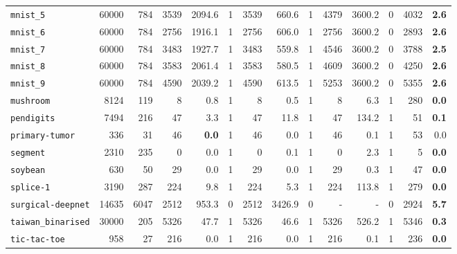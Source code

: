 \begin{tabular}{lccrrrrrrrrrrr}
\texttt{mnist\_5} & \multicolumn{1}{r}{60000} & \multicolumn{1}{r}{784}  & 3539 & 2094.6 & 1 & 3539 & 660.6 & 1 & 4379 & 3600.2 & 0 & 4032 & \textbf{2.6}\\
\texttt{mnist\_6} & \multicolumn{1}{r}{60000} & \multicolumn{1}{r}{784}  & 2756 & 1916.1 & 1 & 2756 & 606.0 & 1 & 2756 & 3600.2 & 0 & 2893 & \textbf{2.6}\\
\texttt{mnist\_7} & \multicolumn{1}{r}{60000} & \multicolumn{1}{r}{784}  & 3483 & 1927.7 & 1 & 3483 & 559.8 & 1 & 4546 & 3600.2 & 0 & 3788 & \textbf{2.5}\\
\texttt{mnist\_8} & \multicolumn{1}{r}{60000} & \multicolumn{1}{r}{784}  & 3583 & 2061.4 & 1 & 3583 & 580.5 & 1 & 4609 & 3600.2 & 0 & 4250 & \textbf{2.6}\\
\texttt{mnist\_9} & \multicolumn{1}{r}{60000} & \multicolumn{1}{r}{784}  & 4590 & 2039.2 & 1 & 4590 & 613.5 & 1 & 5253 & 3600.2 & 0 & 5355 & \textbf{2.6}\\
\texttt{mushroom} & \multicolumn{1}{r}{8124} & \multicolumn{1}{r}{119}  & 8 & 0.8 & 1 & 8 & 0.5 & 1 & 8 & 6.3 & 1 & 280 & \textbf{0.0}\\
\texttt{pendigits} & \multicolumn{1}{r}{7494} & \multicolumn{1}{r}{216}  & 47 & 3.3 & 1 & 47 & 11.8 & 1 & 47 & 134.2 & 1 & 51 & \textbf{0.1}\\
\texttt{primary-tumor} & \multicolumn{1}{r}{336} & \multicolumn{1}{r}{31}  & 46 & \textbf{0.0} & 1 & 46 & 0.0 & 1 & 46 & 0.1 & 1 & 53 & 0.0\\
\texttt{segment} & \multicolumn{1}{r}{2310} & \multicolumn{1}{r}{235}  & 0 & 0.0 & 1 & 0 & 0.1 & 1 & 0 & 2.3 & 1 & 5 & \textbf{0.0}\\
\texttt{soybean} & \multicolumn{1}{r}{630} & \multicolumn{1}{r}{50}  & 29 & 0.0 & 1 & 29 & 0.0 & 1 & 29 & 0.3 & 1 & 47 & \textbf{0.0}\\
\texttt{splice-1} & \multicolumn{1}{r}{3190} & \multicolumn{1}{r}{287}  & 224 & 9.8 & 1 & 224 & 5.3 & 1 & 224 & 113.8 & 1 & 279 & \textbf{0.0}\\
\texttt{surgical-deepnet} & \multicolumn{1}{r}{14635} & \multicolumn{1}{r}{6047}  & 2512 & 953.3 & 0 & 2512 & 3426.9 & 0 & - & - & 0 & 2924 & \textbf{5.7}\\
\texttt{taiwan\_binarised} & \multicolumn{1}{r}{30000} & \multicolumn{1}{r}{205}  & 5326 & 47.7 & 1 & 5326 & 46.6 & 1 & 5326 & 526.2 & 1 & 5346 & \textbf{0.3}\\
\texttt{tic-tac-toe} & \multicolumn{1}{r}{958} & \multicolumn{1}{r}{27}  & 216 & 0.0 & 1 & 216 & 0.0 & 1 & 216 & 0.1 & 1 & 236 & \textbf{0.0}\\

\end{tabular}

